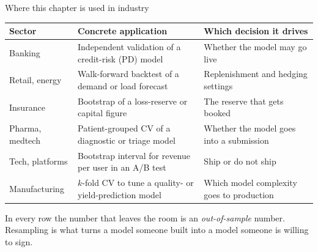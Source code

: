 \documentclass[aspectratio=169,11pt]{beamer}
\begin{document}
\begin{frame}{Where this chapter is used in industry}
  \scriptsize
  \begin{center}
  \begin{tabular}{@{}p{2.5cm}p{5.1cm}p{4.6cm}@{}}
    \toprule
    \textbf{Sector} & \textbf{Concrete application} & \textbf{Which decision it drives} \\
    \midrule
    Banking &
      Independent validation of a credit-risk (PD) model &
      Whether the model may go live \\
    Retail, energy &
      Walk-forward backtest of a demand or load forecast &
      Replenishment and hedging settings \\
    Insurance &
      Bootstrap of a loss-reserve or capital figure &
      The reserve that gets booked \\
    Pharma, medtech &
      Patient-grouped CV of a diagnostic or triage model &
      Whether the model goes into a submission \\
    Tech, platforms &
      Bootstrap interval for revenue per user in an A/B test &
      Ship or do not ship \\
    Manufacturing &
      $k$-fold CV to tune a quality- or yield-prediction model &
      Which model complexity goes to production \\
    \bottomrule
  \end{tabular}
  \end{center}
  \begin{industry}
    In every row the number that leaves the room is an \emph{out-of-sample}
    number. Resampling is what turns a model someone built into a model
    someone is willing to sign.
  \end{industry}
\end{frame}
\end{document}
